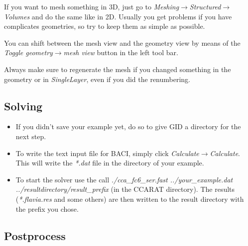 If you want to mesh something in 3D, just go to \emph{Meshing$\to$Structured$\to$Volumes}
and do the same like in 2D. Usually you get problems if you have complicates
geometries, so try to keep them as simple as possible.

You can shift between the mesh view and the geometry view by means
of the \emph{Toggle geometry$\to$mesh view} button in the left tool
bar.

Always make sure to regenerate the mesh if you changed something in
the geometry or in \emph{SingleLayer}, even if you did the renumbering.


\subsection{Solving}

\begin{itemize}
\item If you didn't save your example yet, do so to give GID a directory
for the next step. 
\item To write the text input file for BACI, simply click \emph{Calculate$\to$Calculate}.
This will write the \emph{{*}.dat} file in the directory of your example.
\item To start the solver use the call \emph{./cca\_fc6\_ser.fast ../your\_example.dat
../resultdirectory/result\_prefix} (in the CCARAT directory). The
results (\emph{{*}.flavia.res} and some others) are then written to
the result directory with the prefix you chose.
\end{itemize}

\subsection{Postprocess}

